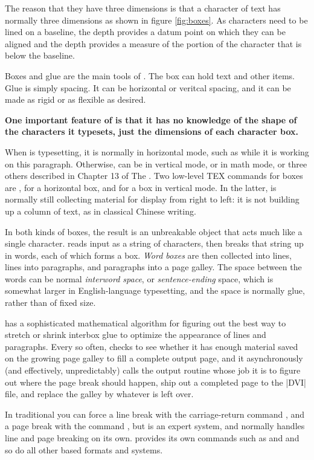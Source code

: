 The reason that they have three dimensions is that a character of text has normally three dimensions as shown in figure \ref{fig:boxes}. As characters need to be lined on a baseline, the depth provides a datum point on which they can be aligned and the depth provides a measure of the portion of the character that is below the baseline.


Boxes and glue are the main tools of \tex. The box can hold text and other items. Glue is simply spacing. It can be horizontal or veritcal spacing, and it can be made as rigid or as flexible as desired.



\textbf{One important feature of \tex is that it has no knowledge of the shape of the characters it typesets, just the dimensions of each character box.}


When \tex is typesetting, it is normally in horizontal mode, such as while
it is working on this paragraph. Otherwise, \tex can be in vertical mode, or
in math mode, or three others described in Chapter 13 of The \texbook.
Two low-level TEX commands for boxes are , for a horizontal box,
and  for a box in vertical mode. In the latter, \tex is normally still
collecting material for display from right to left: it is not building up a
column of text, as in classical Chinese writing.

In both kinds of boxes, the result is an unbreakable object that acts
much like a single character. \tex reads input as a string of characters,
then breaks that string up in words, each of which forms a box. 
\emph{Word boxes}
are then collected into lines, lines into paragraphs, and paragraphs into a
page galley. The space between the words can be normal \emph{interword space},
or \emph{sentence-ending} space, which is somewhat larger in English-language
typesetting, and the space is normally glue, rather than of fixed size.

\tex has a sophisticated mathematical algorithm for figuring out the
best way to stretch or shrink interbox glue to optimize the appearance of
lines and paragraphs. Every so often, \tex checks to see whether it has
enough material saved on the growing page galley to fill a complete output
page, and it asynchronously (and effectively, unpredictably) calls the
output routine whose job it is to figure out where the page break should
happen, ship out a completed page to the |DVI|  file, and replace the galley by
whatever is left over.

In traditional \tex you  can force a line break with the carriage-return command ,
and a page break with the command , but \tex is an expert system,
and normally handles line and page breaking on its own. \latex provides its own commands such as \cmd{\clearpage} and \cmd{\newpage} and so do all other \tex based formats and systems.

